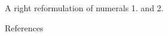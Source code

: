 \documentclass[final]{beamer}
\newlength{\sepwidth}
\newlength{\colwidth}
\newcommand{\separatorcolumn}{\begin{column}{\sepwidth}\end{column}}
\begin{document}
\begin{frame}[t, fragile]
\begin{columns}[t]
\begin{column}{\colwidth}
\begin{block}{A right reformulation of numerals 1. and 2.}
  \end{block}
  
  

 

  \begin{block}{References}

    \nocite{*}
    \footnotesize{}

  \end{block}

\end{column}
\separatorcolumn



\end{columns}
\end{frame}
\end{document}
